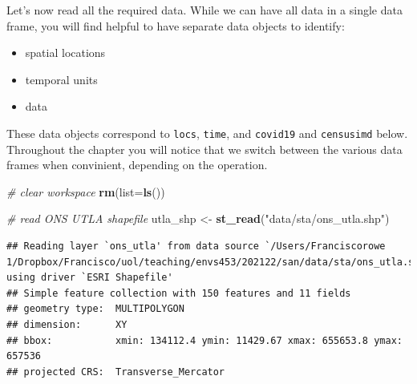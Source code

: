\documentclass[
]{book}
\newenvironment{Shaded}{\begin{snugshade}}{\end{snugshade}}
\newcommand{\CommentTok}[1]{\textcolor[rgb]{0.56,0.35,0.01}{\textit{#1}}}
\newcommand{\DataTypeTok}[1]{\textcolor[rgb]{0.13,0.29,0.53}{#1}}
\newcommand{\KeywordTok}[1]{\textcolor[rgb]{0.13,0.29,0.53}{\textbf{#1}}}
\newcommand{\NormalTok}[1]{#1}
\newcommand{\OperatorTok}[1]{\textcolor[rgb]{0.81,0.36,0.00}{\textbf{#1}}}
\newcommand{\StringTok}[1]{\textcolor[rgb]{0.31,0.60,0.02}{#1}}
\begin{document}
Let's now read all the required data. While we can have all data in a single data frame, you will find helpful to have separate data objects to identify:

\begin{itemize}
\item
  spatial locations
\item
  temporal units
\item
  data
\end{itemize}

These data objects correspond to \texttt{locs}, \texttt{time}, and \texttt{covid19} and \texttt{censusimd} below. Throughout the chapter you will notice that we switch between the various data frames when convinient, depending on the operation.

\begin{Shaded}
\begin{Highlighting}[]
\CommentTok{# clear workspace}
\KeywordTok{rm}\NormalTok{(}\DataTypeTok{list=}\KeywordTok{ls}\NormalTok{())}

\CommentTok{# read ONS UTLA shapefile}
\NormalTok{utla_shp <-}\StringTok{ }\KeywordTok{st_read}\NormalTok{(}\StringTok{"data/sta/ons_utla.shp"}\NormalTok{) }
\end{Highlighting}
\end{Shaded}

\begin{verbatim}
## Reading layer `ons_utla' from data source `/Users/Franciscorowe 1/Dropbox/Francisco/uol/teaching/envs453/202122/san/data/sta/ons_utla.shp' using driver `ESRI Shapefile'
## Simple feature collection with 150 features and 11 fields
## geometry type:  MULTIPOLYGON
## dimension:      XY
## bbox:           xmin: 134112.4 ymin: 11429.67 xmax: 655653.8 ymax: 657536
## projected CRS:  Transverse_Mercator
\end{verbatim}

\begin{Shaded}
\end{Shaded}
\end{document}
